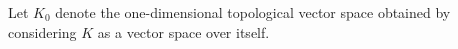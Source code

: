 Let $K_0$ denote the one-dimensional topological vector space obtained by considering $K$ as a vector space over itself.
